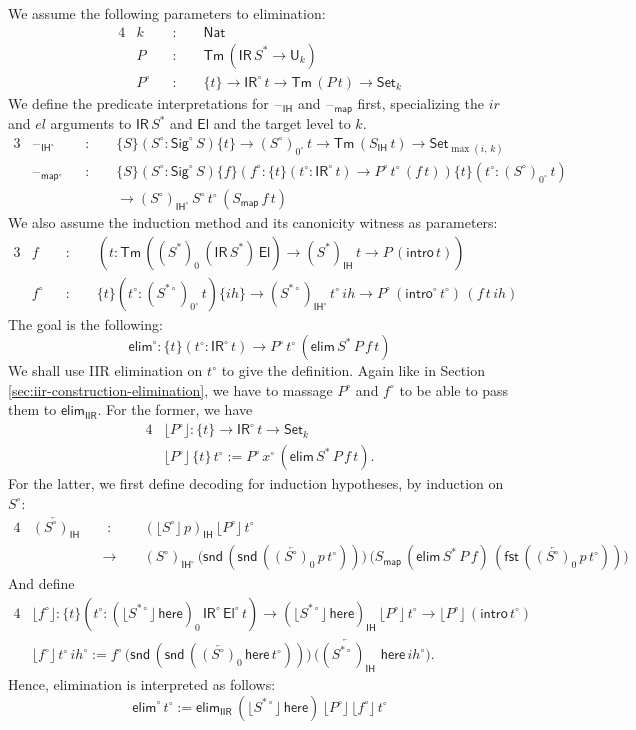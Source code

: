 \documentclass[acmsmall,screen,review,anonymous]{acmart}
\newcommand{\msf}[1]{{\mathsf{#1}}}
\newcommand{\U}{\msf{U}}
\newcommand{\Set}{\msf{Set}}
\newcommand{\Nat}{\msf{Nat}}
\newcommand{\El}{\msf{El}}
\newcommand{\Sig}{\msf{Sig}}
\newcommand{\blank}{{\mathord{\hspace{1pt}\text{--}\hspace{1pt}}}}
\newcommand{\ir}{{ir}}
\newcommand{\el}{{el}}
\newcommand{\IR}{\msf{IR}}
\newcommand{\ih}{{ih}}
\newcommand{\intro}{\msf{intro}}
\newcommand{\IH}{\msf{IH}}
\newcommand{\map}{\msf{map}}
\newcommand{\elim}{\msf{elim}}
\newcommand{\fst}{\msf{fst}}
\newcommand{\snd}{\msf{snd}}
\newcommand{\IIR}{\msf{IIR}}
\newcommand{\floord}[1]{\lfloor #1 \rfloor}
\newcommand{\ola}[1]{\overleftarrow{#1}}
\newcommand{\Tm}{\msf{Tm}}
\newcommand{\w}{\circ}
\newcommand{\here}{\msf{here}}
\newcommand{\Ssw}{S^{*\w}}
\newcommand{\PSbe}{{(\floord{S^{*\circ}}\,\here)}}
\begin{document}
\begin{definition}[Interpretation of $\elim$]
We assume the following parameters to elimination:
\begin{alignat*}{4}
  &k    &&:\,\,&&\Nat\\
  &P    &&:&& \Tm\,(\IR\,S^* \to \U_k)\\
  &P^\w &&:&& \{t\} \to \IR^\w\,t \to \Tm\,(P\,t) \to \Set_k
\end{alignat*}
We define the predicate interpretations for $\blank_\IH$ and $\blank_\map$ first,
specializing the $\ir$ and $\el$ arguments to $\IR\,S^*$ and $\El$ and the target level to $k$.
\begin{alignat*}{3}
  &\blank_{\IH^\w}  &&:\,\,&& \{S\}(S^\w : \Sig^\w\,S)\{t\} \to (S^\w)_{0^\w}\,t \to \Tm\,(S_\IH\,t) \to \Set_{\max(i,\,k)}\\
  &\blank_{\map^\w} &&:\,\,&& \{S\}(S^\w : \Sig^\w\,S)\{f\}(f^\w : \{t\}(t^\w : \IR^\w\,t) \to P^\w\,t^\w\,(f\,t))\{t\}(t^\w : (S^\w)_{0^\w}\,t)\\
  &               &&      &&\to (S^\w)_{\IH^\w}\,S^\w\,t^\w\,(S_\map\,f\,t)
\end{alignat*}
We also assume the induction method and its canonicity witness as parameters:
\begin{alignat*}{3}
  &f    &&:\,\,&& (t : \Tm\,((S^*)_0\,(\IR\,S^*)\,\El) \to (S^*)_\IH\,t \to P\,(\intro\,t))\\
  &f^\w &&:\,\,&& \{t\}(t^\w : (\Ssw)_{0^\w}\,t)\{\ih\} \to (\Ssw)_{\IH^\w}\,t^\w\,\ih \to P^\w\,(\intro^\w\,t^\w)\,(f\,t\,\ih)
\end{alignat*}
The goal is the following:
\[ \elim^\w : \{t\}(t^\w : \IR^\w\,t) \to P^\w\,t^\w\,(\elim\,S^*\,P\,f\,t)  \]
We shall use IIR elimination on $t^\w$ to give the definition. Again like in Section \ref{sec:iir-construction-elimination}, we
have to massage $P^\w$ and $f^\w$ to be able to pass them to $\elim_\IIR$. For the former, we have
\begin{alignat*}{4}
  &\floord{P^\w} : \{t\} \to \IR^\w\,t \to \Set_k\\
  &\floord{P^\w}\,\{t\}\,t^\w := P^\w\,x^\w\,(\elim\,S^*\,P\,f\,t).
\end{alignat*}
For the latter, we first define decoding for induction hypotheses, by induction
on $S^\w$:
\begin{alignat*}{4}
  &\ola{(S^\w)_\IH} &&\,\,:&&(\floord{S^\w}\,p)_\IH\,\floord{P^\w}\,t^\w\\
  & &&\to\,\,&&(S^\w)_{\IH^\w}\,\big(\snd\,(\snd\,(\ola{(S^\w)_0}\,p\,t^\w))\big)\,\big(S_\map\,(\elim\,S^*\,P\,f)\,(\fst\,(\ola{(S^\w)_0}\,p\,t^\w))\big)
\end{alignat*}
And define
\begin{alignat*}{4}
  &\floord{f^\w} : \{t\}(t^\w : \PSbe_0\,\IR^\w\,\El^\w\,t) \to \PSbe_\IH\,\floord{P^\w}\,t^\w \to \floord{P^\w}\,(\intro\,t^\w)\\
  &\floord{f^\w}\,t^\w\,\ih^\w := f^\w\,\big(\snd\,(\snd\,(\ola{(S^\w)_0}\,\here\,t^\w))\big)\,\big(\ola{(S^{*\w})_{\IH}}\,\,\here\,\ih^\w\big).
\end{alignat*}
Hence, elimination is interpreted as follows:
\[ \elim^\w\,t^\w := \elim_\IIR\,\PSbe\,\floord{P^\w}\,\floord{f^\w}\,t^\w \]
\end{definition}
\end{document}
